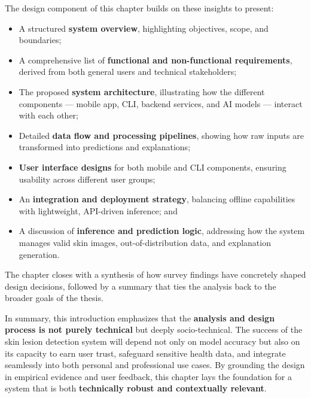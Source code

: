 \documentclass[
  12pt,
  oneside]{article}
\providecommand{\tightlist}{%
  \setlength{\itemsep}{0pt}\setlength{\parskip}{0pt}}
\begin{document}
The design component of this chapter builds on these insights to
present:

\begin{itemize}
\tightlist
\item
  A structured \textbf{system overview}, highlighting objectives, scope,
  and boundaries;\\
\item
  A comprehensive list of \textbf{functional and non-functional
  requirements}, derived from both general users and technical
  stakeholders;\\
\item
  The proposed \textbf{system architecture}, illustrating how the
  different components --- mobile app, CLI, backend services, and AI
  models --- interact with each other;\\
\item
  Detailed \textbf{data flow and processing pipelines}, showing how raw
  inputs are transformed into predictions and explanations;\\
\item
  \textbf{User interface designs} for both mobile and CLI components,
  ensuring usability across different user groups;\\
\item
  An \textbf{integration and deployment strategy}, balancing offline
  capabilities with lightweight, API-driven inference; and\\
\item
  A discussion of \textbf{inference and prediction logic}, addressing
  how the system manages valid skin images, out-of-distribution data,
  and explanation generation.
\end{itemize}

The chapter closes with a synthesis of how survey findings have
concretely shaped design decisions, followed by a summary that ties the
analysis back to the broader goals of the thesis.

In summary, this introduction emphasizes that the \textbf{analysis and
design process is not purely technical} but deeply socio-technical. The
success of the skin lesion detection system will depend not only on
model accuracy but also on its capacity to earn user trust, safeguard
sensitive health data, and integrate seamlessly into both personal and
professional use cases. By grounding the design in empirical evidence
and user feedback, this chapter lays the foundation for a system that is
both \textbf{technically robust and contextually relevant}.
\end{document}
